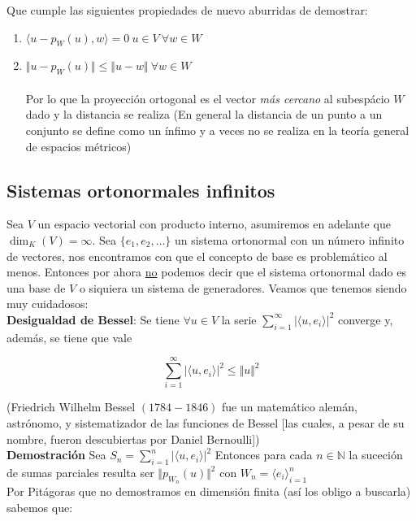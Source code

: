 \documentclass[a4paper,spanish]{article}
\def\N {\mathbb{N}}
\numberwithin{equation}{section}
\begin{document}
Que cumple las siguientes propiedades de nuevo aburridas de demostrar:

\begin{enumerate}
\item $\langle{u-p_W\left({u}\right),w}\rangle=0 \  u \in V \ \forall w \in W $
\item $\Vert{u-p_W\left({u}\right)\Vert \leq \Vert{u-w}\Vert \ \forall w\in W}$\\\\
Por lo que la proyecci\'on ortogonal es el vector \textit{m\'as cercano} al subesp\'acio $W$ dado y la distancia se realiza (En general la distancia de un punto a un conjunto se define como un \'infimo y a veces no se realiza en la teor\'ia general de espacios m\'etricos)
\end{enumerate}

\subsection{Sistemas ortonormales infinitos}
Sea $V$ un espacio vectorial con producto interno, asumiremos en adelante que $\dim_K \left(V\right)=\infty$. Sea $\lbrace{e_1,e_2,\dots}\rbrace$ un sistema ortonormal con un n\'umero infinito de vectores, nos encontramos con que el concepto de base es problem\'atico al menos. Entonces por ahora \underline{no} podemos decir que el sistema ortonormal dado es una base de $V$ o siquiera un sistema de generadores. Veamos que tenemos siendo muy cuidadosos:\\

\textbf{Desigualdad de Bessel}: Se tiene $\forall u \in V$ la serie $\sum\limits_{i=1}^{\infty}\vert{\langle{u,e_i}\rangle}\vert^2$
converge y, adem\'as, se tiene que vale

\[\sum\limits_{i=1}^{\infty}\vert{\langle{u,e_i}\rangle}\vert^2 \leq \Vert{u}\Vert ^2\]

(Friedrich Wilhelm Bessel $(1784 - 1846)$ fue un matem\'atico alem\'an, astr\'onomo, y sistematizador de las funciones de Bessel [las cuales, a pesar de su nombre, fueron descubiertas por Daniel Bernoulli])\\

\textbf{Demostraci\'on}
Sea $ S_n = \sum \limits_{i=1}^{n}{\vert{\langle{u,e_i}\rangle}\vert^2} $ Entonces para cada $n\in\N$ la suceci\'on de sumas parciales resulta ser  $\Vert{p_{W_{n}} \left({u}\right)}\Vert ^2$ con $W_n = \langle{e_i}\rangle_{i=1}^{n}$\\
Por Pit\'agoras que no demostramos en dimensi\'on finita (as\'i los obligo a buscarla) sabemos que:
\end{document}
